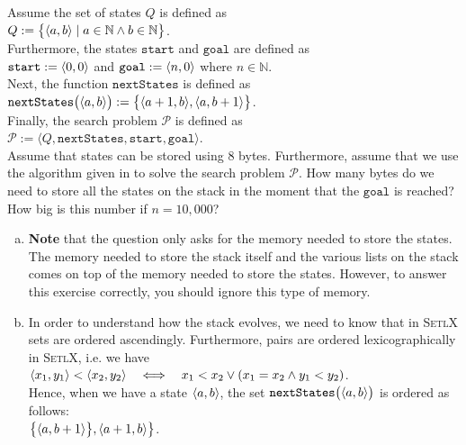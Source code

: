 \exercise
Assume the set of states $Q$ is defined as
\\[0.2cm]
\hspace*{1.3cm}
$Q := \bigl\{ \pair(a, b) \mid a \in \mathbb{N} \wedge b \in \mathbb{N} \bigr\}$.
\\[0.2cm]
Furthermore, the states $\mathtt{start}$ and $\mathtt{goal}$ are defined as
\\[0.2cm]
\hspace*{1.3cm}
$\mathtt{start} := \pair(0,0)$ \quad and \quad $\mathtt{goal} := \pair(n,0)$ where $n \in \mathbb{N}$.
\\[0.2cm]
Next, the function $\mathtt{nextStates}$ is defined as
\\[0.2cm]
\hspace*{1.3cm}
$\mathtt{nextStates}\bigl(\pair(a,b)\bigr) := \bigl\{\pair(a+1,b), \pair(a,b+1)\bigr\}$.
\\[0.2cm]
Finally, the search problem $\mathcal{P}$ is defined as
\\[0.2cm]
\hspace*{1.3cm}
$\mathcal{P} := \langle Q, \mathtt{nextStates}, \mathtt{start}, \mathtt{goal} \rangle$.
\\[0.2cm]
Assume that states can be stored using 8 bytes.  Furthermore, assume that we use the algorithm given in
 to solve the search problem $\mathcal{P}$.
How many bytes do we need to store all the states on the stack in the moment that the $\mathtt{goal}$
is reached? How big is this number if $n = 10,000$?
\vspace*{0.2cm}

\noindent
\begin{enumerate}[(a)]
\item \textbf{Note} that the question only asks for the memory needed to store the states.  The memory
      needed to store the stack itself and the various lists on the stack comes on top of the memory
      needed to store the states.  However,
      to answer this exercise correctly, you should ignore this type of memory.
\item In order to understand how the stack evolves, we need to know that in \textsc{SetlX} sets are ordered
      ascendingly.  Furthermore, pairs are ordered lexicographically in \textsc{SetlX}, i.e. we have
      \\[0.2cm]
      \hspace*{1.3cm}
      $\pair(x_1, y_1) < \pair(x_2, y_2) \quad\Longleftrightarrow\quad x_1 < x_2 \vee (x_1 = x_2 \wedge y_1 < y_2)$.
      \\[0.2cm]
      Hence, when we have a state $\pair(a, b)$, the set $\mathtt{nextStates}\bigl(\pair(a, b)\bigr)$ is
      ordered as follows:
      \\[0.2cm]
      \hspace*{1.3cm}
      $\bigl\{\pair(a,b+1)\bigr\}, \pair(a+1,b) \bigr\}$. \eoxs
\end{enumerate}

